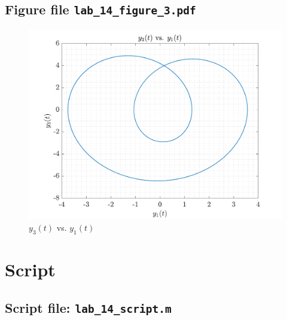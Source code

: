 \subsection{Figure file \lstinline[style=Plain]{lab_14_figure_3.pdf}}
\begin{figure}[!hbtp]
    \centering
    \includegraphics[height=0.38\textheight]{../src/lab_14_figure_3.pdf}
    \caption{$y_{3}(t)$ vs. $y_{1}(t)$}
    \label{fig:my_label}
\end{figure}

\newpage
\section{Script}
\subsection{Script file: \lstinline[style=Plain]{lab_14_script.m}}

